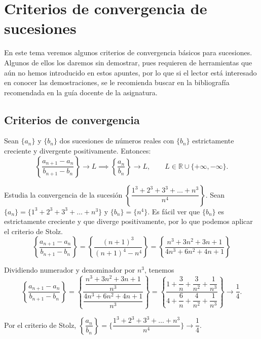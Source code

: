 \chapter{Criterios de convergencia de sucesiones}

En este tema veremos algunos criterios de convergencia básicos para sucesiones. Algunos de ellos los daremos sin demostrar, pues requieren de herramientas que aún no hemos introducido en estos apuntes, por lo que si el lector está interesado en conocer las demostraciones, se le recomienda buscar en la bibliografía recomendada en la guía docente de la asignatura.


\section{Criterios de convergencia}
\begin{teo}
    Sean $\{a_n\}$ y $\{b_n\}$ dos sucesiones de números reales con $\{b_n\}$ estrictamente creciente y divergente positivamente.
    Entonces:
    \begin{equation*}
        \left\{\dfrac{a_{n+1} - a_n}{b_{n+1} - b_n}\right\} \longrightarrow L \implies \left\{\dfrac{a_n}{b_n}\right\} \longrightarrow L, \qquad L \in \mathbb{R} \cup \{+ \infty, -\infty\}.
    \end{equation*}
\end{teo}

\begin{ejemplo}
    Estudia la convergencia de la sucesión $\left\{\dfrac{1^3 + 2^3 + 3^3 + \dots + n^3}{n^4}\right\}$.
    \newline
    \newline
    Sean $\{a_n\} = \{1^3 + 2^3 + 3^3 + \dots + n^3\}$ y $\{b_n\} = \{n^4\}$. Es fácil ver que $\{b_n\}$ es estrictamente
    creciente y que diverge positivamente, por lo que podemos aplicar el criterio de Stolz.
    \begin{equation*}
        \left\{\frac{a_{n+1} - a_n}{b_{n+1} - b_n}\right\} = \left\{\frac{(n+1)^3}{(n+1)^4- n^4}\right\} = \left\{\frac{n^3 + 3n^2 + 3n + 1}{4n^3 + 6n^2 + 4n + 1}\right\}
    \end{equation*}
    
    Dividiendo numerador y denominador por $n^3$, tenemos
    \begin{equation*}
        \left\{\dfrac{a_{n+1} - a_n}{b_{n+1} - b_n}\right\} = \left\{\dfrac{\dfrac{n^3 + 3n^2 + 3n + 1}{n^3}}{\dfrac{4n^3 + 6n^2 + 4n + 1}{n^3}}\right\} =
        \left\{ \dfrac{1 + \dfrac{3}{n} + \dfrac{3}{n^2} + \dfrac{1}{n^3}}{4 + \dfrac{6}{n} + \dfrac{4}{n^2} + \dfrac{1}{n^3}} \right\} \longrightarrow \dfrac{1}{4}.
    \end{equation*}
    
    Por el criterio de Stolz, $\left\{\dfrac{a_n}{b_n}\right\} = \{\dfrac{1^3 + 2^3 + 3^3 + \dots + n^3}{n^4}\} \longrightarrow \dfrac{1}{4}$.
\end{ejemplo}

